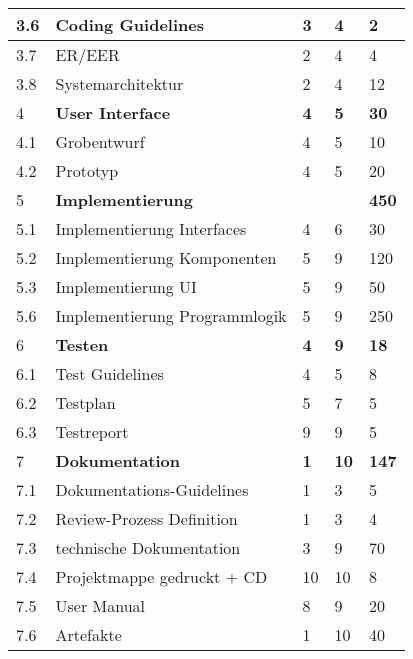 \begin{tabular}{ | l | p{8cm} | l |l|l|}
\hline
3.6 &Coding Guidelines                 &3 &4 & 2 \\
\hline
3.7 &ER/EER                            &2 &4 & 4 \\
\hline
3.8 &Systemarchitektur                 &2 &4 & 12 \\
\hline
4 &\textbf{User Interface}                   &\textbf{4} &\textbf{5} & \textbf{30} \\
\hline
4.1 &Grobentwurf                       &4 &5 & 10 \\
\hline
4.2 &Prototyp                          &4 &5 & 20 \\
\hline
5 &\textbf{Implementierung}                 & & & \textbf{450} \\
\hline
5.1 &Implementierung Interfaces        &4 &6 & 30 \\
\hline
5.2 &Implementierung Komponenten       &5 &9 & 120 \\
\hline
5.3 &Implementierung UI                &5 &9 & 50 \\
\hline
5.6 &Implementierung Programmlogik     &5 &9 & 250 \\
\hline
6 &\textbf{Testen}                           &\textbf{4} &\textbf{9} & \textbf{18} \\
\hline
6.1 &Test Guidelines                   &4 &5 & 8 \\
\hline
6.2 &Testplan                          &5 &7 & 5 \\
\hline
6.3 &Testreport                        &9 &9 & 5 \\
\hline
7 &\textbf{Dokumentation}                   &\textbf{1} &\textbf{10} &\textbf{147}  \\
\hline
7.1 &Dokumentations-Guidelines         &1 &3 & 5 \\
\hline
7.2 &Review-Prozess Definition         &1 &3 & 4 \\
\hline
7.3 &technische Dokumentation          &3 &9 & 70 \\
\hline
7.4 &Projektmappe gedruckt + CD        &10 &10 & 8 \\
\hline
7.5 &User Manual                       &8 &9 & 20 \\
\hline
7.6 &Artefakte                         &1 &10 & 40 \\
\hline
\end{tabular}

